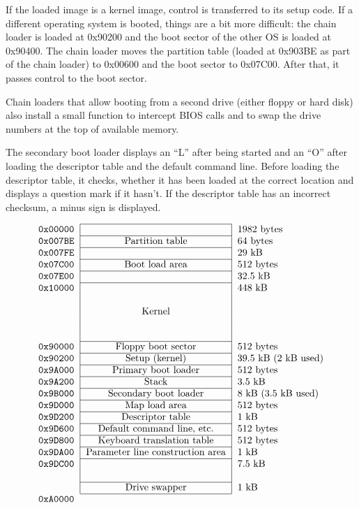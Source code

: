 \documentclass[fullpage]{article}
\begin{document}
If the loaded image is a kernel image, control is transferred to
its setup code.
If a different operating system is booted, things are a bit more difficult:
the chain loader is loaded at 0x90200 and the boot sector of the other OS
is loaded at 0x90400. The chain loader moves the partition table (loaded at
0x903BE as part of the chain loader) to 0x00600 and the boot sector to
0x07C00. After that, it passes control to the boot sector.

Chain loaders that allow booting from a second drive (either floppy or hard
disk) also install a small function to intercept BIOS calls and to swap
the drive numbers at the top of available memory.

The secondary boot loader displays an ``L'' after being started and an ``O''
after loading the descriptor table and the default command line. Before
loading the descriptor table, it checks, whether it has been loaded at the
correct location and displays a question mark if it hasn't. If the
descriptor table has an incorrect checksum, a minus sign is displayed.

$$
\begin{tabular}{l|c|l}
  \cline{2-2}
  \tt 0x00000 & & 1982 bytes \\
  \cline{2-2}
  \tt 0x007BE & Partition table & 64 bytes \\
  \cline{2-2}
  \tt 0x007FE & & 29 kB \\
  \cline{2-2}
  \tt 0x07C00 & Boot load area & 512 bytes \\
  \cline{2-2}
  \tt 0x07E00 & & 32.5 kB \\
  \cline{2-2}
  \tt 0x10000 & & 448 kB \\
  & & \\
  & Kernel & \\
  & & \\
  & & \\
  \cline{2-2}
  \tt 0x90000 & Floppy boot sector & 512 bytes \\
  \cline{2-2}
  \tt 0x90200 & Setup (kernel) & 39.5 kB (2 kB used) \\
  \cline{2-2}
  \tt 0x9A000 & Primary boot loader & 512 bytes \\
  \cline{2-2}
  \tt 0x9A200 & Stack & 3.5 kB \\
  \cline{2-2}
  \tt 0x9B000 & Secondary boot loader & 8 kB (3.5 kB used) \\
  \cline{2-2}
  \tt 0x9D000 & Map load area & 512 bytes \\
  \cline{2-2}
  \tt 0x9D200 & Descriptor table & 1 kB \\
  \cline{2-2}
  \tt 0x9D600 & Default command line, etc. & 512 bytes \\
  \cline{2-2}
  \tt 0x9D800 & Keyboard translation table & 512 bytes \\
  \cline{2-2}
  \tt 0x9DA00 & Parameter line construction area & 1 kB \\
  \cline{2-2}
  \tt 0x9DC00 & & 7.5 kB \\
  & & \\
  \cline{2-2}
  & Drive swapper & 1 kB \\
  \cline{2-2}
  \multicolumn{3}{l}{\tt 0xA0000} \\
\end{tabular}
$$
\end{document}
